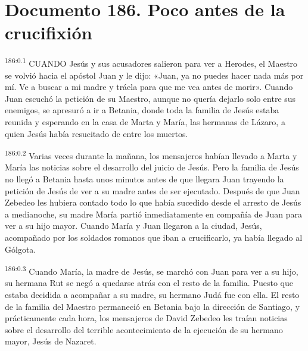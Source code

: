 \chapter{Documento 186. Poco antes de la crucifixión}
\par
\textsuperscript{186:0.1} CUANDO Jesús y sus acusadores salieron para ver a Herodes, el Maestro se volvió hacia el apóstol Juan y le dijo: «Juan, ya no puedes hacer nada más por mí. Ve a buscar a mi madre y tráela para que me vea antes de morir». Cuando Juan escuchó la petición de su Maestro, aunque no quería dejarlo solo entre sus enemigos, se apresuró a ir a Betania, donde toda la familia de Jesús estaba reunida y esperando en la casa de Marta y María, las hermanas de Lázaro, a quien Jesús había resucitado de entre los muertos.

\par
\textsuperscript{186:0.2} Varias veces durante la mañana, los mensajeros habían llevado a Marta y María las noticias sobre el desarrollo del juicio de Jesús. Pero la familia de Jesús no llegó a Betania hasta unos minutos antes de que llegara Juan trayendo la petición de Jesús de ver a su madre antes de ser ejecutado. Después de que Juan Zebedeo les hubiera contado todo lo que había sucedido desde el arresto de Jesús a medianoche, su madre María partió inmediatamente en compañía de Juan para ver a su hijo mayor. Cuando María y Juan llegaron a la ciudad, Jesús, acompañado por los soldados romanos que iban a crucificarlo, ya había llegado al Gólgota.

\par
\textsuperscript{186:0.3} Cuando María, la madre de Jesús, se marchó con Juan para ver a su hijo, su hermana Rut se negó a quedarse atrás con el resto de la familia. Puesto que estaba decidida a acompañar a su madre, su hermano Judá fue con ella. El resto de la familia del Maestro permaneció en Betania bajo la dirección de Santiago, y prácticamente cada hora, los mensajeros de David Zebedeo les traían noticias sobre el desarrollo del terrible acontecimiento de la ejecución de su hermano mayor, Jesús de Nazaret.

